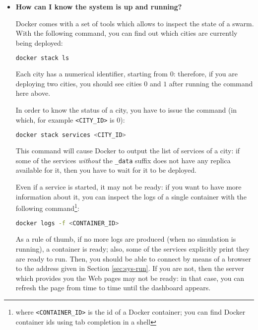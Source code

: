 \begin{itemize}
\item \textbf{How can I know the system is up and running?}

Docker comes with a set of tools which allows to inspect the state of a swarm.
With the following command, you can find out which cities are currently being
deployed:

\begin{lstlisting}[language=bash]
docker stack ls
\end{lstlisting}

Each city has a numerical identifier, starting from $0$: therefore, if you are
deploying two cities, you should see cities $0$ and $1$ after running the
command here above.

In order to know the status of a city, you have to issue the command (in which,
for example \texttt{<CITY\_ID>} is $0$):

\begin{lstlisting}[language=bash]
docker stack services <CITY_ID>
\end{lstlisting}

This command will cause Docker to output the list of services of a city: if
some of the services \emph{without} the \texttt{\_data} suffix does not have
any replica available for it, then you have to wait for it to be deployed.

Even if a service is started, it may not be ready: if you want to have more
information about it, you can inspect the logs of a single container with the
following command\footnote{where \texttt{<CONTAINER\_ID>} is the id of a Docker
container; you can find Docker container ids using tab completion in a shell}:

\begin{lstlisting}[language=bash]
docker logs -f <CONTAINER_ID>
\end{lstlisting}

As a rule of thumb, if no more logs are produced (when no simulation is
running), a container is ready; also, some of the services explicitly print
they are ready to run.
Then, you should be able to connect by means of a browser to the address given
in Section \ref{sec:sys-run}.
If you are not, then the server which provides you the Web pages may not be
ready: in that case, you can refresh the page from time to time until the
dashboard appears.

\end{itemize}
